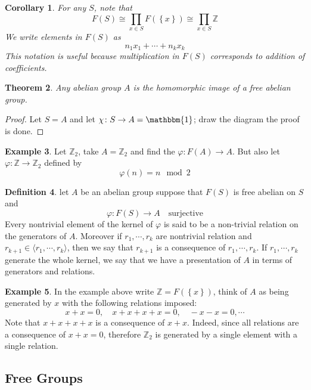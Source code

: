 \documentclass[11pt,a4paper]{article}
\theoremstyle{definition}
\newtheorem{definition}{Definition}[section]
\newtheorem{example}[definition]{Example}
\theoremstyle{plain}
\newtheorem{theorem}[definition]{Theorem}
\newtheorem{corollary}[definition]{Corollary}
\theoremstyle{remark}
\newcommand{\Z}{\mathbb{Z}}
\renewcommand{\set}[1]{\left\{ #1 \right\}}
\newcommand{\angles}[1]{\langle #1 \rangle}
\newcommand{\1}{\mathbbm{1}}
\begin{document}
\begin{corollary}
    For any $S$, note that 
    $$F(S) \cong \prod_{x \in S} F(\set{x}) \cong \prod_{x \in S} \Z$$
    We write elements in $F(S)$ as 
    $$n_1 x_1 + \cdots + n_k x_k$$
    This notation is useful because multiplication in $F(S)$ corresponds to addition of coefficients.
\end{corollary}

\begin{theorem}
    Any abelian group $A$ is the homomorphic image of a free abelian group. 
\end{theorem}

\begin{proof}
    Let $S = A$ and let $\chi \colon S \to A = \1$; draw the diagram the proof is done.     
\end{proof}

\begin{example}
    Let $\Z_2 $, take $A = \Z_2$ and find the $\varphi \colon F(A) \to A$. But also let $\varphi \colon \Z \to \Z_2$ defined by 
    $$\varphi (n) = n \mod 2$$
\end{example}

\begin{definition}
    let $A$ be an abelian group suppose that $F(S)$ is free abelian on $S$ and 
    $$\varphi \colon F(S) \to A \quad \text{surjective}$$
    Every nontrivial element of the kernel of $\varphi$ is said to be a non-trivial relation on the generators of $A$. 
    Moreover if $r_1, \cdots, r_k$ are nontrivial relation and $r_{k+1} \in \angles{r_1, \cdots, r_k}$, then we say that 
    $r_{k+1}$ is a consequence of $r_1, \cdots, r_k$. If $r_1, \cdots, r_k$ generate the whole kernel, we say that we have a presentation 
    of $A$ in terms of generators and relations. 
\end{definition}

\begin{example}
    In the example above write $\Z = F(\set{x})$, think of $A$ as being generated by $x$ with the following relations imposed: 
    $$x + x = 0, \quad x + x + x + x = 0, \quad -x-x = 0, \cdots$$
    Note that $x + x + x + x$ is a consequence of $x + x$. Indeed, since all relations are a consequence of $x + x = 0$, therefore 
    $\Z_2$ is generated by a single element with a single relation.  
\end{example}

\subsection*{Free Groups}
\end{document}
